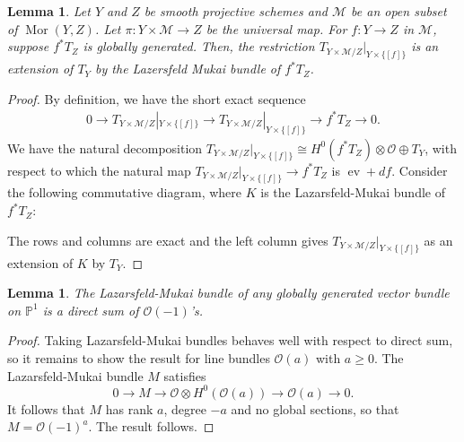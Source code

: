 \documentclass[11pt,reqno]{amsart}
\theoremstyle{plain}
\newtheorem{lemma}[theorem]{Lemma}
\theoremstyle{definition}
\theoremstyle{remark}
\numberwithin{equation}{section}
\newcommand{\cO}{{\mathscr O}}
\renewcommand{\to}{{\longrightarrow}}
\numberwithin{equation}{section}
\newcommand{\PP}{\mathbb{P}}
\newcommand{\cM}{\mathcal{M}}
\begin{document}
\begin{lemma}
\label{reltmor}
Let $Y$ and $Z$ be smooth projective schemes and $\cM$ be an open subset of $\operatorname{Mor}(Y,Z)$. Let $\pi: Y\times\cM\to Z$ be the universal map. For $f: Y\to Z$ in $\cM$, suppose $f^{*}T_Z$ is globally generated. Then, the restriction $T_{Y\times\cM/Z}|_{Y\times\{[f]\}}$ is an extension of $T_Y$ by the Lazersfeld Mukai bundle of $f^{*}T_Z$.
\end{lemma}

\begin{proof}
By definition, we have the short exact sequence
\begin{align*}
    0\to T_{Y\times\cM/Z}|_{Y\times\{[f]\}}\to T_{Y\times\cM/Z}|_{Y\times\{[f]\}}\to f^{*}T_Z\to 0.
\end{align*}
We have the natural decomposition $T_{Y\times\cM/Z}|_{Y\times\{[f]\}}\cong H^0(f^{*}T_Z)\otimes \cO\oplus T_Y$, with respect to which the natural map $T_{Y\times\cM/Z}|_{Y\times\{[f]\}}\to f^{*}T_Z$ is $\operatorname{ev}+df$.   Consider the following commutative diagram, where $K$ is the Lazarsfeld-Mukai bundle of $f^{*}T_Z$:
\begin{center}
\end{center}
The rows and columns are exact and the left column gives $T_{Y\times\cM/Z}|_{Y\times\{[f]\}}$ as an extension of $K$ by $T_Y$.
\end{proof}


\begin{lemma}
\label{lem-O-1}
The Lazarsfeld-Mukai bundle of any globally generated vector bundle on $\PP^1$ is a direct sum of $\cO(-1)$'s.
\end{lemma}
\begin{proof}
Taking Lazarsfeld-Mukai bundles behaves well with respect to direct sum, so it remains to show the result for line bundles $\cO(a)$ with $a \geq 0$. The Lazarsfeld-Mukai bundle $M$ satisfies
\[ 0 \to M \to \cO \otimes H^0(\cO(a)) \to \cO(a) \to 0 .  \]
It follows that $M$ has rank $a$, degree $-a$ and no global sections, so that $M= \cO(-1)^a$. The result follows.
\end{proof}
\end{document}
